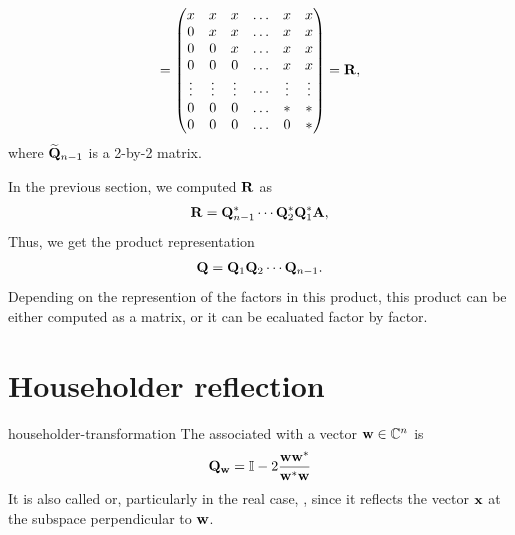 \begin{intro}
\begin{gather}
    =
    \begin{pmatrix}
      x & x & x & \dots & x & x \\
      0 & x & x & \dots & x & x \\
      0 & 0 & x & \dots & x & x \\
      0 & 0 & 0 & \dots & x & x \\
      \vdots & \vdots & \vdots & \cdots & \vdots & \vdots \\
      0 & 0 & 0 & \dots & * & * \\
      0 & 0 & 0 & \dots & 0 & * \\
    \end{pmatrix} = \mathbf R,
  \end{gather}
  where $\widetilde{\mathbf Q}_{n-1}$ is a 2-by-2 matrix.
\end{intro}

\begin{intro}
  \label{sec:ortho:qr:q-product}
  In the previous section, we computed $\mathbf R$ as
  \begin{gather}
    \mathbf R = \mathbf Q_{n-1}^* \cdots \mathbf Q_{2}^*\mathbf Q_{1}^*\mathbf A,
  \end{gather}
  Thus, we get the product representation
  \begin{gather}
    \mathbf Q = \mathbf Q_{1} \mathbf Q_{2} \cdots \mathbf Q_{n-1}.
  \end{gather}
  Depending on the represention of the factors in this product, this
  product can be either computed as a matrix, or it can be ecaluated
  factor by factor.
\end{intro}

\section{Householder reflection}

\begin{Definition}{householder-transformation}
  The 
  associated with a vector $\mathbf w\in\mathbb C^n$ is
  \begin{gather}
    \mathbf Q_{\mathbf w} = \mathbb I - 2\frac{\mathbf w\mathbf w^*}{\mathbf w^*\mathbf w}
  \end{gather}
  It is also called  or, particularly in
  the real case, , since it reflects
  the vector $\mathbf x$ at the subspace perpendicular to $\mathbf w$.
\end{Definition}

